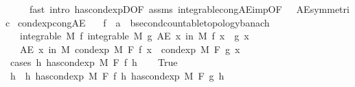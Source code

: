 \begin{isabellebody}
\ \ \ \ \ {\isacharparenleft}{\kern0pt}fast\ intro{\isacharcolon}{\kern0pt}\ has{\isacharunderscore}{\kern0pt}cond{\isacharunderscore}{\kern0pt}expD{\isacharbrackleft}{\kern0pt}OF\ assms{\isacharparenleft}{\kern0pt}{}{\isacharparenright}{\kern0pt}{\isacharbrackright}{\kern0pt}\ integrable{\isacharunderscore}{\kern0pt}cong{\isacharunderscore}{\kern0pt}AE{\isacharunderscore}{\kern0pt}imp{\isacharbrackleft}{\kern0pt}OF\ {\isacharunderscore}{\kern0pt}\ {\isacharunderscore}{\kern0pt}\ AE{\isacharunderscore}{\kern0pt}symmetric{\isacharbrackright}{\kern0pt}{\isacharparenright}{\kern0pt}{\isacharplus}{\kern0pt}%
\endisatagproof
{\isafoldproof}%
%
\isadelimproof
\isanewline
%
\endisadelimproof
\isanewline
{}\isamarkupfalse%
\ cond{\isacharunderscore}{\kern0pt}exp{\isacharunderscore}{\kern0pt}cong{\isacharunderscore}{\kern0pt}AE{\isacharcolon}{\kern0pt}\isanewline
\ \ \ f\ {\isacharcolon}{\kern0pt}{\isacharcolon}{\kern0pt}\ {\isachardoublequoteopen}{\isacharprime}{\kern0pt}a\ {\isasymRightarrow}\ {\isacharprime}{\kern0pt}b{\isacharcolon}{\kern0pt}{\isacharcolon}{\kern0pt}{\isacharbraceleft}{\kern0pt}second{\isacharunderscore}{\kern0pt}countable{\isacharunderscore}{\kern0pt}topology{\isacharcomma}{\kern0pt}banach{\isacharbraceright}{\kern0pt}{\isachardoublequoteclose}\isanewline
\ \ \ {\isachardoublequoteopen}integrable\ M\ f{\isachardoublequoteclose}\ {\isachardoublequoteopen}integrable\ M\ g{\isachardoublequoteclose}\ {\isachardoublequoteopen}AE\ x\ in\ M{\isachardot}{\kern0pt}\ f\ x\ {\isacharequal}{\kern0pt}\ g\ x{\isachardoublequoteclose}\isanewline
\ \ \ {\isachardoublequoteopen}AE\ x\ in\ M{\isachardot}{\kern0pt}\ cond{\isacharunderscore}{\kern0pt}exp\ M\ F\ f\ x\ {\isacharequal}{\kern0pt}\ cond{\isacharunderscore}{\kern0pt}exp\ M\ F\ g\ x{\isachardoublequoteclose}\isanewline
%
\isadelimproof
%
\endisadelimproof
%
\isatagproof
{}\isamarkupfalse%
\ {\isacharparenleft}{\kern0pt}cases\ {\isachardoublequoteopen}{\isasymexists}h{\isachardot}{\kern0pt}\ has{\isacharunderscore}{\kern0pt}cond{\isacharunderscore}{\kern0pt}exp\ M\ F\ f\ h{\isachardoublequoteclose}{\isacharparenright}{\kern0pt}\isanewline
\ \ \isamarkupfalse%
\ True\isanewline
\ \ \isamarkupfalse%
\ \isamarkupfalse%
\ h\ \ h{\isacharcolon}{\kern0pt}\ {\isachardoublequoteopen}has{\isacharunderscore}{\kern0pt}cond{\isacharunderscore}{\kern0pt}exp\ M\ F\ f\ h{\isachardoublequoteclose}\ {\isachardoublequoteopen}has{\isacharunderscore}{\kern0pt}cond{\isacharunderscore}{\kern0pt}exp\ M\ F\ g\ h{\isachardoublequoteclose}\ \isamarkupfalse%

\end{isabellebody}
